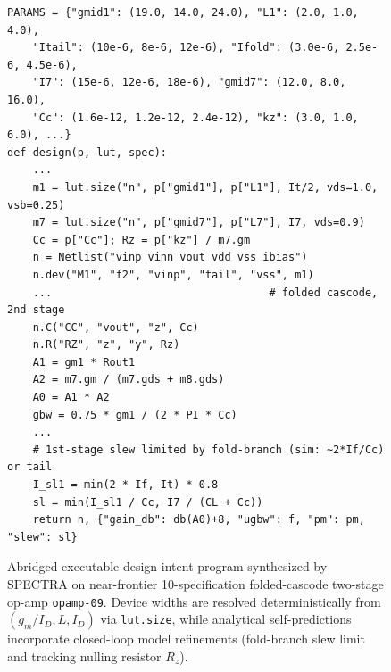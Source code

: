 \begin{figure}[t]
\begin{lstlisting}[style=prog]
PARAMS = {"gmid1": (19.0, 14.0, 24.0), "L1": (2.0, 1.0, 4.0),
    "Itail": (10e-6, 8e-6, 12e-6), "Ifold": (3.0e-6, 2.5e-6, 4.5e-6),
    "I7": (15e-6, 12e-6, 18e-6), "gmid7": (12.0, 8.0, 16.0),
    "Cc": (1.6e-12, 1.2e-12, 2.4e-12), "kz": (3.0, 1.0, 6.0), ...}
def design(p, lut, spec):
    ...
    m1 = lut.size("n", p["gmid1"], p["L1"], It/2, vds=1.0, vsb=0.25)
    m7 = lut.size("n", p["gmid7"], p["L7"], I7, vds=0.9)
    Cc = p["Cc"]; Rz = p["kz"] / m7.gm
    n = Netlist("vinp vinn vout vdd vss ibias")
    n.dev("M1", "f2", "vinp", "tail", "vss", m1)
    ...                                  # folded cascode, 2nd stage
    n.C("CC", "vout", "z", Cc)
    n.R("RZ", "z", "y", Rz)
    A1 = gm1 * Rout1
    A2 = m7.gm / (m7.gds + m8.gds)
    A0 = A1 * A2
    gbw = 0.75 * gm1 / (2 * PI * Cc)
    ...
    # 1st-stage slew limited by fold-branch (sim: ~2*If/Cc) or tail
    I_sl1 = min(2 * If, It) * 0.8
    sl = min(I_sl1 / Cc, I7 / (CL + Cc))
    return n, {"gain_db": db(A0)+8, "ugbw": f, "pm": pm, "slew": sl}
\end{lstlisting}
\caption{Abridged executable design-intent program synthesized by \textsc{SPECTRA} on near-frontier 10-specification folded-cascode two-stage op-amp \texttt{opamp-09}. Device widths are resolved deterministically from $(g_m/I_D, L, I_D)$ via \texttt{lut.size}, while analytical self-predictions incorporate closed-loop model refinements (fold-branch slew limit and tracking nulling resistor $R_z$).}
\label{fig:program}
\end{figure}
